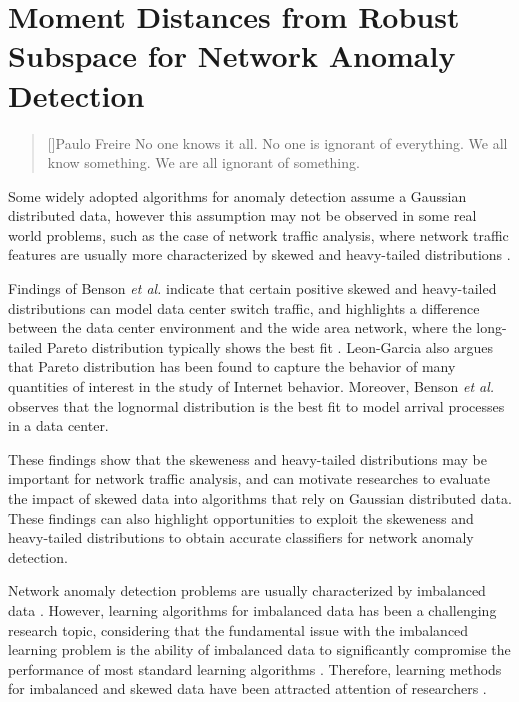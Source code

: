 \chapter{Moment Distances from Robust Subspace for Network Anomaly Detection}
\label{ch:4_m_rpca}

\begin{quotation}[]{Paulo Freire}
No one knows it all. No one is ignorant of everything. We all know something. We are all ignorant of something.
\end{quotation}

Some widely adopted algorithms for anomaly detection assume a Gaussian distributed data, however this assumption may not be observed in some real world problems, such as the case of network traffic analysis, where network traffic features are usually more characterized by skewed and heavy-tailed distributions \cite{lakhina2005mining,benson2010network, leon2017probability}.

Findings of Benson \emph{et al.}  \cite{benson2010network} indicate that certain positive skewed and heavy-tailed distributions can model data center switch traffic, and highlights a difference between the data center environment and the wide area network, where the long-tailed Pareto distribution typically shows the best fit \cite{benson2010network}. Leon-Garcia \cite{leon2017probability} also argues that Pareto distribution has been found to capture the behavior of many quantities of interest in the study of Internet behavior. Moreover, Benson \emph{et al.}  \cite{benson2010network} observes that the lognormal distribution is the best fit to model arrival processes in a data center.

These findings show that the skeweness and heavy-tailed distributions may be important for network traffic analysis, and can motivate researches to evaluate the impact of skewed data into algorithms that rely on Gaussian distributed data. These findings can also highlight opportunities to  exploit the skeweness and heavy-tailed distributions to obtain accurate classifiers for network anomaly detection.

Network anomaly detection problems are usually characterized by imbalanced data \cite{Phua2004minority,he2008learning,benson2010network}. However, learning algorithms for imbalanced data has been a challenging research topic, considering that the fundamental issue with the imbalanced learning problem is the ability of imbalanced data to significantly compromise the performance of most standard learning algorithms \cite{he2008learning}. Therefore, learning methods for imbalanced and skewed data have been attracted attention of researchers \cite{Phua2004minority,hubert2009robustskewed}.

